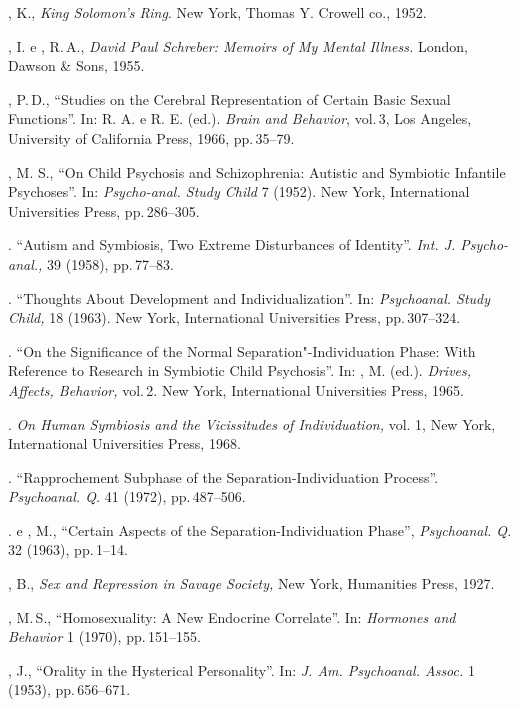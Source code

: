 \begin{bibliohedra}
, K., \textit{King Solomon's Ring}. New York, Thomas Y.
Crowell co., 1952.

, I. e , R.\,A., \textit{David Paul Schreber: Memoirs of My
Mental Illness. }London, Dawson \& Sons, 1955.

, P.\,D., ``Studies on the Cerebral Representation of
Certain Basic Sexual Functions''. In:  R. A. e 
 R. E. (ed.). \textit{Brain and Behavior},
vol.\,3, Los Angeles, University of California Press, 1966, pp.\,35--79.

, M. S., ``On Child Psychosis and Schizophrenia: Autistic
and Symbiotic Infantile Psychoses''. In: \textit{Psycho-anal. Study
Child }7 (1952). New York, International Universities Press, pp.\,286--305.

. ``Autism and Symbiosis, Two Extreme Disturbances
of Identity''. \textit{Int. J. Psycho-anal., }39 (1958), pp.\,77--83.

. ``Thoughts About Development and
Individualization''. In: \textit{Psychoanal. Study Child, }18 (1963). 
New York, International Universities Press, pp.\,307--324.

. ``On the Significance of the Normal
Separation"-Individuation Phase: With Reference to Research in Symbiotic Child
Psychosis''. In: , M. (ed.). \textit{Drives, Affects, Behavior, }vol.\,2. New York, 
International Universities Press, 1965.

. \textit{On Human Symbiosis and the Vicissitudes of
Individuation, }vol. 1, New York, International Universities Press, 1968.

. ``Rapprochement Subphase of the
Separation-Individuation Process''. \textit{Psychoanal. Q. }41
(1972), pp.\,487--506.

. e , M., ``Certain Aspects of the
Separation-Individuation Phase'', \textit{Psychoanal. Q. }32 (1963),
pp.\,1--14.

, B., \textit{Sex and Repression in Savage Society, }New York,
Humanities Press, 1927.

, M.\,S., ``Homosexuality: A New Endocrine
Correlate''. In: \textit{Hormones and Behavior }1 (1970), pp.\,151--155.

, J., ``Orality in the Hysterical
Personality''. In: \textit{ J. Am. Psychoanal. Assoc. }1 (1953), pp.\,656--671.


\end{bibliohedra}
